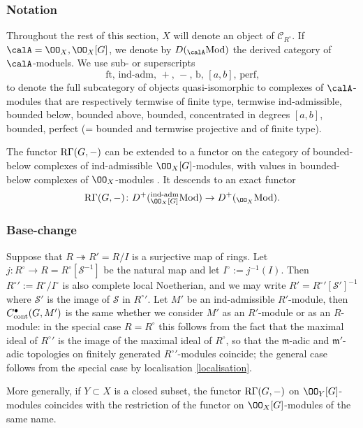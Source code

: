 \subsubsection{Notation}
Throughout the rest of this section,
$X$ will denote an object of $\mathscr{C}_{R^{\circ}}$.  If $\calA=\OO_{X}, \OO_{X}[G]$, we denote  by $D({}_{\calA}{\rm Mod})$ the derived category of $\calA$-moduels. We use sub- or superscripts $$\text{ft,  {ind-adm}, $+$, $-$, {b}, $[a, b]$,  {perf},} $$ to denote the full subcategory of objects quasi-isomorphic to complexes of $\calA$-modules that are respectively termwise of finite type, termwise ind-admissible, bounded below, bounded above, bounded, concentrated in degrees $[a,b]$, bounded, perfect (= bounded and termwise projective and of finite type).


\begin{prop}
\notready
The functor ${\rm R}\Gamma(G, -)$ can be extended  to a functor on the category of bounded-below complexes of ind-admissible $\OO_{X}[G]$-modules, with values in bounded-below complexes of $\OO_{X}$-modules \cite[(3.4.1.3), (3.5.1.1)]{nek-selmer}. It descends to an exact   functor
$${\rm R}\Gamma(G, -)\colon D^{+}({}^{\textup{ind-adm}}_{\OO_{X}[G]}{\rm Mod})\to D^{+}({}_{\OO_{X}}{\rm Mod}).$$
\end{prop}


\subsubsection{Base-change} Suppose that $R\twoheadrightarrow R'=R/I$ is a surjective map of rings. Let $j\colon R^{\circ} \to R= R^{\circ}[\mathscr{S}^{-1}]$ be the natural map and let  $I^{\circ}:= j^{-1}(I)$. Then $R^{\circ}{}':= R^{\circ}/I^{\circ}$ is also complete local Noetherian, and  we may write $R'= R^{\circ}{}'[\mathscr{S}']^{-1}$ where  $\mathscr{S}'$ is the image of $\mathscr{S}$ in $R^{\circ}{}'$. Let $M'$ be an ind-admissible $R'$-module, then $C^{\bullet}_{\rm cont}(G, M')$ is the same whether we consider $M'$ as an $R'$-module or as an $R$-module: in the special case $R=R^{\circ}$ this follows from the fact that the maximal ideal of $R^{\circ}{}'$ is the image of the maximal ideal of $R^{\circ}$, so that the $\mathfrak{m}$-adic and $\mathfrak{m}'$-adic topologies on finitely generated $R^{\circ}{}'$-modules coincide; the general case   follows from  the special case by localisation \eqref{localisation}.

More generally, if $Y\subset X $ is a closed subset, the functor ${\rm R}\Gamma(G, -)$ on $\OO_{Y}[G]$-modules coincides with the restriction of the functor on $\OO_{X}[G]$-modules of the same name.

